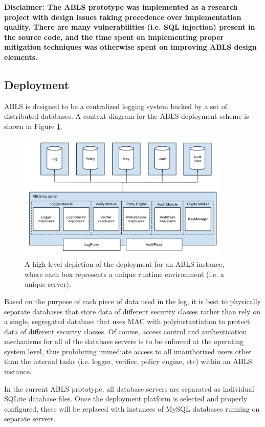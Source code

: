 \documentclass{sig-alternate}
\begin{document}
\textbf{Disclaimer: The ABLS prototype was implemented as a research project with design issues taking precedence 
over implementation quality. There are many vulnerabilities (i.e. SQL injection) present in the source code, and the 
time spent on implementing proper mitigation techniques was otherwise spent on improving ABLS design elements}.

\subsection{Deployment}
\label{sec:deployment}
ABLS is designed to be a centralized logging system backed by a set of distributed databases. A context
diagram for the ABLS deployment scheme is shown in Figure \ref{fig:deployment}.

\begin{figure}[htb!]
\begin{center}
\includegraphics[width=4in]{images/deployment.pdf}
\caption{A high-level depiction of the deployment for an ABLS instance, where each box represents a unique runtime environment (i.e. a unique server).}
\label{fig:deployment}
\end{center}
\end{figure}

Based on the purpose of each piece of data used in the log, it is best to physically separate databases
that store data of different security classes rather than rely on a single, segregated database that uses MAC with 
polyinstantiation to protect data of different security classes. Of course, access control
and authentication mechanisms for all of the database servers is to be enforced at the operating system level, thus
prohibiting immediate access to all unauthorized users other than the internal tasks (i.e. logger, verifier, policy engine, etc) 
within an ABLS instance. 

In the current ABLS prototype, all database servers are separated as individual SQLite database files. Once
the deployment platform is selected and properly configured, these will be replaced with instances of MySQL 
databases running on separate servers.
\end{document}
